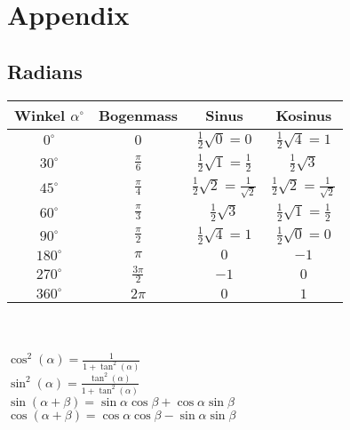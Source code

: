 \section{Appendix}

\subsection{Radians}

\begin{tabular}{cccc}
    Winkel $\alpha^\circ$ & Bogenmass & Sinus & Kosinus \\ [1.5ex] \hline
    $0^\circ$ & $0$ & $\frac{1}{2}\sqrt{0} = 0$ & $\frac{1}{2}\sqrt{4} = 1$ \\ [1.5ex] \hline
    $30^\circ$ & $\frac{\pi}{6}$ & $\frac{1}{2} \sqrt{1} = \frac{1}{2}$ & $\frac{1}{2} \sqrt{3}$ \\ [1.5ex] \hline
    $45^\circ$ & $\frac{\pi}{4}$ & $\frac{1}{2}\sqrt{2} = \frac{1}{\sqrt{2}}$ & $\frac{1}{2}\sqrt{2} = \frac{1}{\sqrt{2}}$ \\ [1.5ex] \hline
    $60^\circ$ & $\frac{\pi}{3}$ & $\frac{1}{2}\sqrt{3}$ & $\frac{1}{2}\sqrt{1} = \frac{1}{2}$ \\ [1.5ex] \hline
    $90^\circ$ & $\frac{\pi}{2}$ & $\frac{1}{2}\sqrt{4} = 1$ & $\frac{1}{2} \sqrt{0} = 0$ \\ [1.5ex] \hline
    $180^\circ$ & $\pi$ & $0$ & $-1$ \\ [1.5ex] \hline
    $270^\circ$ & $\frac{3\pi}{2}$ & $-1$ & $0$ \\ [1.5ex] \hline
    $360^\circ$ & $2\pi$ & $0$ & $1$ \\ [1.5ex] \hline
\end{tabular} \\
\\
$\cos^2(\alpha) = \frac{1}{1 + \tan^2(\alpha)}$ \\
$\sin^2(\alpha) = \frac{\tan^2(\alpha)}{1 + \tan^2(\alpha)}$ \\
$\sin(\alpha + \beta) = \sin \alpha \cos \beta + \cos \alpha \sin \beta$ \\
$\cos(\alpha + \beta) = \cos \alpha \cos \beta - \sin \alpha \sin \beta$